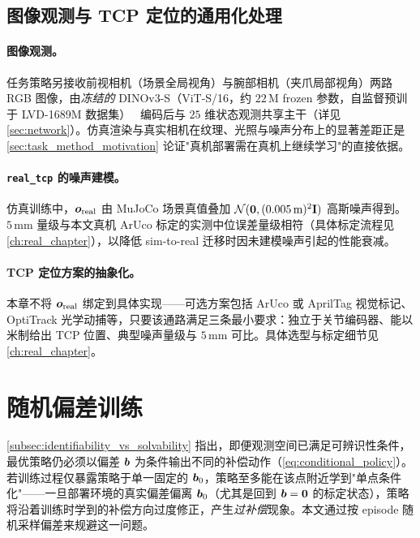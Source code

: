 \subsection{图像观测与 TCP 定位的通用化处理}\label{subsec:obs_image_tcp}

\paragraph{图像观测。}任务策略另接收前视相机（场景全局视角）与腕部相机（夹爪局部视角）两路 RGB 图像，由\emph{冻结的} DINOv3-S（ViT-S/16，约 $22$\,M frozen 参数，自监督预训于 LVD-1689M 数据集）~\cite{simeoni2025dinov3} 编码后与 $25$ 维状态观测共享主干（详见\cref{sec:network}）。仿真渲染与真实相机在纹理、光照与噪声分布上的显著差距正是\cref{sec:task_method_motivation} 论证"真机部署需在真机上继续学习"的直接依据。

\paragraph{\texttt{real\_tcp} 的噪声建模。}仿真训练中，$\bm{o}_\text{real}$ 由 MuJoCo 场景真值叠加 $\mathcal{N}(\bm{0}, (0.005\,\text{m})^2\mathbf{I})$ 高斯噪声得到。$5\,\text{mm}$ 量级与本文真机 ArUco 标定的实测中位误差量级相符（具体标定流程见\cref{ch:real_chapter}），以降低 sim-to-real 迁移时因未建模噪声引起的性能衰减。

\paragraph{TCP 定位方案的抽象化。}本章不将 $\bm{o}_\text{real}$ 绑定到具体实现——可选方案包括 ArUco 或 AprilTag 视觉标记、OptiTrack 光学动捕等，只要该通路满足三条最小要求：独立于关节编码器、能以米制给出 TCP 位置、典型噪声量级与 $5$\,mm 可比。具体选型与标定细节见\cref{ch:real_chapter}。

\section{随机偏差训练}\label{sec:random_bias}

\cref{subsec:identifiability_vs_solvability} 指出，即便观测空间已满足可辨识性条件，最优策略仍必须以偏差 $\bm{b}$ 为条件输出不同的补偿动作（\cref{eq:conditional_policy}）。若训练过程仅暴露策略于单一固定的 $\bm{b}_0$，策略至多能在该点附近学到"单点条件化"——一旦部署环境的真实偏差偏离 $\bm{b}_0$（尤其是回到 $\bm{b}=\bm{0}$ 的标定状态），策略将沿着训练时学到的补偿方向过度修正，产生\emph{过补偿}现象。本文通过按 episode 随机采样偏差来规避这一问题。

